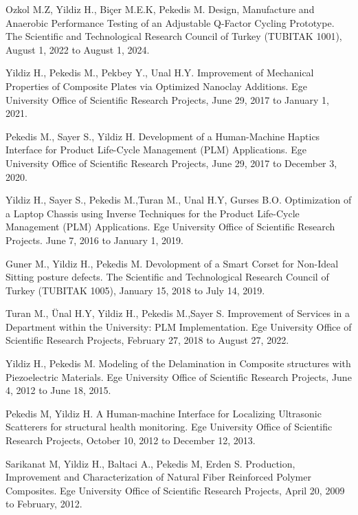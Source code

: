 \documentclass[10pt]{article}
\begin{document}
\begin{bibenum}
	\item Ozkol M.Z, Yildiz H., Biçer M.E.K, Pekedis M. Design, Manufacture and Anaerobic Performance 
		Testing of an Adjustable Q-Factor Cycling Prototype. The Scientific and Technological
		Research Council of Turkey (TUBITAK 1001), August 1, 2022 to August 1, 2024.
		
	\item  Yildiz H., Pekedis M., Pekbey Y., Unal H.Y. Improvement of Mechanical Properties
		of Composite Plates via Optimized Nanoclay Additions. Ege University Office 
		of Scientific Research Projects, June 29, 2017 to January 1, 2021.
		
	\item Pekedis M., Sayer S., Yildiz H. Development of a Human-Machine Haptics Interface 
		for Product Life-Cycle Management (PLM) Applications. Ege University Office of Scientific 
		Research Projects, June 29, 2017 to December 3, 2020.
							
	\item Yildiz H., Sayer S., Pekedis M.,Turan M., Unal H.Y, Gurses B.O. Optimization of a
		Laptop Chassis using Inverse Techniques for the Product Life-Cycle Management (PLM) Applications.
		Ege University Office of Scientific Research Projects. June 7, 2016 to January 1, 2019.
		

	\item	Guner M., Yildiz H., Pekedis M. Devolopment of a Smart Corset for Non-Ideal
		Sitting posture defects. The Scientific and Technological Research Council of Turkey (TUBITAK 1005), 
		January 15, 2018 to July 14, 2019.
		
 	\item Turan M., Ünal H.Y, Yildiz H., Pekedis M.,Sayer S. Improvement of Services in a Department
 		within the University: PLM Implementation. Ege University Office of Scientific Research Projects,
 		 February 27, 2018 to August 27, 2022.
 		 
	\item Yildiz H., Pekedis M. Modeling of the Delamination in Composite structures
		with Piezoelectric Materials. Ege University Office of Scientific Research Projects, 
		June 4, 2012 to June 18, 2015.
		
	\item Pekedis M, Yildiz H. A Human-machine Interface for Localizing Ultrasonic Scatterers
		for structural health monitoring. Ege University Office of Scientific Research Projects, 
		October 10, 2012 to December 12, 2013.
	
	\item Sarikanat M, Yildiz H., Baltaci A., Pekedis M, Erden S. Production, Improvement and
		Characterization of Natural Fiber Reinforced Polymer Composites. Ege University
		Office of Scientific Research Projects, April 20, 2009 to February, 2012.



\end{bibenum}
\end{document}
